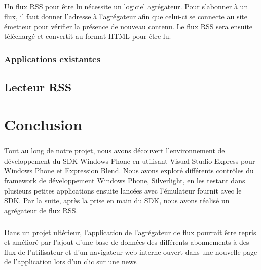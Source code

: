\documentclass[twoside,UTF8]{EPURapport}
\begin{document}
\paragraph{}
Un flux RSS pour être lu nécessite un logiciel agrégateur. Pour s'abonner à un flux, il faut donner l'adresse à l'agrégateur afin que celui-ci se connecte au site émetteur pour vérifier la présence de nouveau contenu. Le flux RSS sera ensuite téléchargé et convertit au format HTML pour être lu.
		
		\subsection{Applications existantes}

	\section{Lecteur RSS}
	



\chapter{Conclusion}

\paragraph{}
Tout au long de notre projet, nous avons découvert l'environnement de développement du SDK Windows Phone en utilisant Visual Studio Express pour Windows Phone et Expression Blend. Nous avons exploré différents contrôles du framework de développement Windows Phone, Silverlight, en les testant dans plusieurs petites applications ensuite lancées avec l'émulateur fournit avec le SDK. Par la suite, après la prise en main du SDK, nous avons réalisé un agrégateur de flux RSS. 


\paragraph{}
Dans un projet ultérieur, l'application de l'agrégateur de flux pourrait être repris et amélioré par l'ajout d'une base de données des différents abonnements à des flux de l'utilisateur et d'un navigateur web interne ouvert dans une nouvelle page de l'application lors d'un clic sur une news 


\printindex
\end{document}
